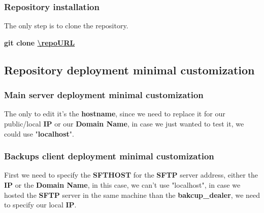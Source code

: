\subsubsection{Repository installation}\label{subsubsec:repo-installation}
\begin{flushleft}
    The only step is to clone the repository.
    \begin{flushleft}
        \textbf{git clone \url{\repoURL}}
    \end{flushleft}
\end{flushleft}




\subsection{Repository deployment minimal customization}\label{subsec:repo-customization}
\subsubsection[Main server deployment minimal customization]{Main server deployment minimal customization}

\begin{flushleft}
    The only to edit it's the \textbf{hostname}, since we need to replace it for our public/local \textbf{IP}
    or our \textbf{Domain Name}, in case we just wanted to test it, we could use "\textbf{localhost}".
\end{flushleft}

\subsubsection[Backups client deployment minimal customization]{Backups client deployment minimal customization}
\begin{flushleft}
    
    
    First we need to specify the \textbf{SFTHOST} for the \textbf{SFTP} server address, either the \textbf{IP} or the
    \textbf{Domain Name}, in this case, we can't use "localhost", in case we hosted the \textbf{SFTP} server in the same machine
    than the \textbf{bakcup\_dealer}, we need to specify our local \textbf{IP}.
\end{flushleft}

